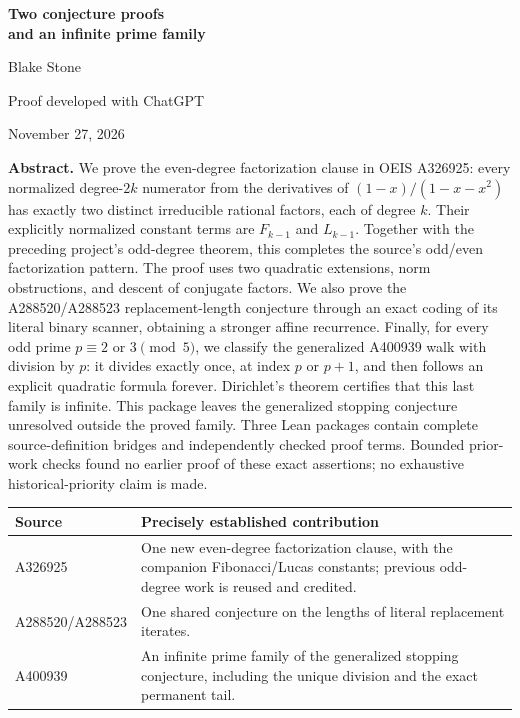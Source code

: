 \documentclass[11pt]{article}
\begin{document}
\begin{center}
{\LARGE\bfseries Two conjecture proofs\\[3pt]and an infinite prime family}\par
\vspace{0.5em}
{\large Blake Stone}\par
Proof developed with ChatGPT\par
November 27, 2026
\end{center}

\textbf{Abstract.}
We prove the even-degree factorization clause in OEIS A326925:
every normalized degree-$2k$ numerator from the derivatives of
$(1-x)/(1-x-x^2)$ has exactly two distinct irreducible rational factors,
each of degree $k$. Their explicitly normalized constant terms are
$F_{k-1}$ and $L_{k-1}$. Together with the preceding project's
odd-degree theorem, this completes the source's odd/even factorization
pattern. The proof uses two quadratic extensions, norm obstructions,
and descent of conjugate factors. We also prove the A288520/A288523
replacement-length conjecture through an exact coding of its literal
binary scanner, obtaining a stronger affine recurrence. Finally, for
every odd prime $p\equiv2$ or $3\pmod5$, we classify the generalized
A400939 walk with division by $p$: it divides exactly once, at index
$p$ or $p+1$, and then follows an explicit quadratic formula forever.
Dirichlet's theorem certifies that this last family is infinite.
This package leaves the generalized stopping conjecture unresolved
outside the proved family. Three Lean packages contain complete source-definition
bridges and independently checked proof terms. Bounded prior-work
checks found no earlier proof of these exact assertions; no exhaustive
historical-priority claim is made.

\begin{center}
\begin{tabular}{@{}l>{\raggedright\arraybackslash}p{4.65in}@{}}
\toprule
Source & Precisely established contribution\\
\midrule
A326925 & One new even-degree factorization clause, with the companion
Fibonacci/Lucas constants; previous odd-degree work is reused and credited.\\
A288520/A288523 & One shared conjecture on the lengths of literal replacement iterates.\\
A400939 & An infinite prime family of the generalized stopping conjecture,
including the unique division and the exact permanent tail.\\
\bottomrule
\end{tabular}
\end{center}
\end{document}
